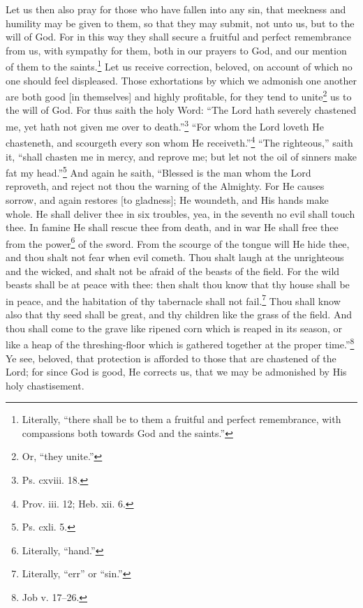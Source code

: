 Let us then also pray for those who have fallen into any sin, that meekness and humility may be given to them, so that they may submit, not unto us, but to the will of God. For in this way they shall secure a fruitful and perfect remembrance from us, with sympathy for them, both in our prayers to God, and our mention of them to the saints.\footnote{Literally, “there shall be to them a fruitful and perfect remembrance, with compassions both towards God and the saints.”} Let us receive correction, beloved, on account of which no one should feel displeased. Those exhortations by which we admonish one another are both good [in themselves] and highly profitable, for they tend to unite\footnote{Or, “they unite.”} us to the will of God. For thus saith the holy Word: “The Lord hath severely chastened me, yet hath not given me over to death.”\footnote{Ps. cxviii. 18.} “For whom the Lord loveth He chasteneth, and scourgeth every son whom He receiveth.”\footnote{Prov. iii. 12; Heb. xii. 6.} “The righteous,” saith it, “shall chasten me in mercy, and reprove me; but let not the oil of sinners make fat my head.”\footnote{Ps. cxli. 5.} And again he saith, “Blessed is the man whom the Lord reproveth, and reject not thou the warning of the Almighty.  For He causes sorrow, and again restores [to gladness]; He woundeth, and His hands make whole. He shall deliver thee in six troubles, yea, in the seventh no evil shall touch thee. In famine He shall rescue thee from death, and in war He shall free thee from the power\footnote{Literally, “hand.”} of the sword. From the scourge of the tongue will He hide thee, and thou shalt not fear when evil cometh. Thou shalt laugh at the unrighteous and the wicked, and shalt not be afraid of the beasts of the field. For the wild beasts shall be at peace with thee: then shalt thou know that thy house shall be in peace, and the habitation of thy tabernacle shall not fail.\footnote{Literally, “err” or “sin.”} Thou shall know also that thy seed shall be great, and thy children like the grass of the field. And thou shall come to the grave like ripened corn which is reaped in its season, or like a heap of the threshing-floor which is gathered together at the proper time.”\footnote{Job v. 17–26.} Ye see, beloved, that protection is afforded to those that are chastened of the Lord; for since God is good, He corrects us, that we may be admonished by His holy chastisement.


